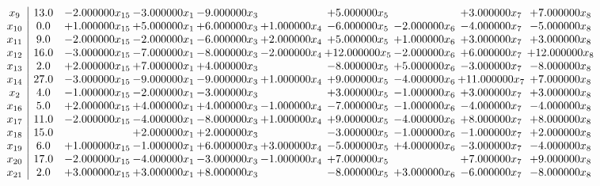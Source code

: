 \documentclass[10pt]{article}
\begin{document}
 \[\begin{array}{c| c c@{\hskip 2pt} c@{\hskip 2pt} c@{\hskip 2pt} c@{\hskip 2pt} c@{\hskip 2pt} c@{\hskip 2pt} c@{\hskip 2pt} c@{\hskip 2pt} }
 x_{9}   &  13.0 & -2.000000 x_{15} & -3.000000 x_{1} & -9.000000 x_{3} &   & + 5.000000 x_{5} &   & + 3.000000 x_{7} & + 7.000000 x_{8}\\
 x_{10}   &  0.0 & + 1.000000 x_{15} & + 5.000000 x_{1} & + 6.000000 x_{3} & + 1.000000 x_{4} & -6.000000 x_{5} & -2.000000 x_{6} & -4.000000 x_{7} & -5.000000 x_{8}\\
 x_{11}   &  9.0 & -2.000000 x_{15} & -2.000000 x_{1} & -6.000000 x_{3} & + 2.000000 x_{4} & + 5.000000 x_{5} & + 1.000000 x_{6} & + 3.000000 x_{7} & + 3.000000 x_{8}\\
 x_{12}   &  16.0 & -3.000000 x_{15} & -7.000000 x_{1} & -8.000000 x_{3} & -2.000000 x_{4} & + 12.000000 x_{5} & -2.000000 x_{6} & + 6.000000 x_{7} & + 12.000000 x_{8}\\
 x_{13}   &  2.0 & + 2.000000 x_{15} & + 7.000000 x_{1} & + 4.000000 x_{3} &   & -8.000000 x_{5} & + 5.000000 x_{6} & -3.000000 x_{7} & -8.000000 x_{8}\\
 x_{14}   &  27.0 & -3.000000 x_{15} & -9.000000 x_{1} & -9.000000 x_{3} & + 1.000000 x_{4} & + 9.000000 x_{5} & -4.000000 x_{6} & + 11.000000 x_{7} & + 7.000000 x_{8}\\
 x_{2}   &  4.0 & -1.000000 x_{15} & -2.000000 x_{1} & -3.000000 x_{3} &   & + 3.000000 x_{5} & -1.000000 x_{6} & + 3.000000 x_{7} & + 3.000000 x_{8}\\
 x_{16}   &  5.0 & + 2.000000 x_{15} & + 4.000000 x_{1} & + 4.000000 x_{3} & -1.000000 x_{4} & -7.000000 x_{5} & -1.000000 x_{6} & -4.000000 x_{7} & -4.000000 x_{8}\\
 x_{17}   &  11.0 & -2.000000 x_{15} & -4.000000 x_{1} & -8.000000 x_{3} & + 1.000000 x_{4} & + 9.000000 x_{5} & -4.000000 x_{6} & + 8.000000 x_{7} & + 8.000000 x_{8}\\
 x_{18}   &  15.0  &   & + 2.000000 x_{1} & + 2.000000 x_{3} &   & -3.000000 x_{5} & -1.000000 x_{6} & -1.000000 x_{7} & + 2.000000 x_{8}\\
 x_{19}   &  6.0 & + 1.000000 x_{15} & -1.000000 x_{1} & + 6.000000 x_{3} & + 3.000000 x_{4} & -5.000000 x_{5} & + 4.000000 x_{6} & -3.000000 x_{7} & -4.000000 x_{8}\\
 x_{20}   &  17.0 & -2.000000 x_{15} & -4.000000 x_{1} & -3.000000 x_{3} & -1.000000 x_{4} & + 7.000000 x_{5} &   & + 7.000000 x_{7} & + 9.000000 x_{8}\\
 x_{21}   &  2.0 & + 3.000000 x_{15} & + 3.000000 x_{1} & + 8.000000 x_{3} &   & -8.000000 x_{5} & + 3.000000 x_{6} & -6.000000 x_{7} & -8.000000 x_{8}\\

\end{array}\]
\end{document}
